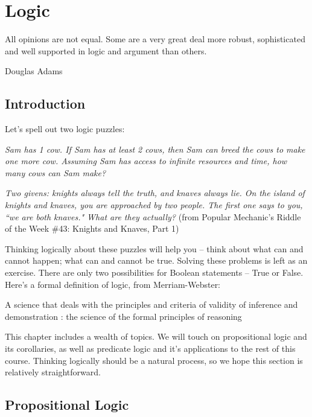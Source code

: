 \documentclass[main.tex]{subfiles}
\begin{document}
\chapter{Logic}
\label{chapter:logic}

\epigraph{All opinions are not equal. Some are a very great deal more robust, sophisticated and well supported in logic and argument than others.}{Douglas Adams}

\minitoc

\section{Introduction}

Let's spell out two logic puzzles:

\begin{center}
	\textit{Sam has 1 cow. If Sam has at least 2 cows, then Sam can breed the cows to make one more cow. Assuming Sam has access to infinite resources and time, how many cows can Sam make?}
\end{center}

\begin{center}
	\textit{Two givens: knights always tell the truth, and knaves always lie. On the island of knights and knaves, you are approached by two people. The first one says to you, ``we are both knaves." What are they actually?} (from Popular Mechanic's Riddle of the Week \#43: Knights and Knaves, Part 1)
\end{center}

Thinking logically about these puzzles will help you -- think about what can and cannot happen; what can and cannot be true. Solving these problems is left as an exercise. There are only two possibilities for Boolean statements -- True or False. Here's a formal definition of logic, from Merriam-Webster:

\begin{defn}
	A science that deals with the principles and criteria of validity of inference and demonstration : the science of the formal principles of reasoning
\end{defn}

This chapter includes a wealth of topics. We will touch on propositional logic and its corollaries, as well as predicate logic and it's applications to the rest of this course. Thinking logically should be a natural process, so we hope this section is relatively straightforward.

\section{Propositional Logic}
\end{document}
